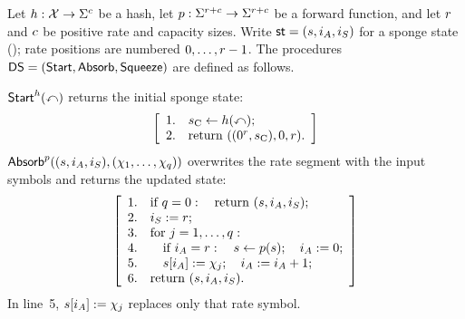 \begin{construction}
\label{constr:dsfs_duplex_sponge}
Let \(h:\mathcal X\to\Sigma^{c}\) be a hash, let \(p:\Sigma^{r+c}\to\Sigma^{r+c}\) be a forward function, and let \(r\) and \(c\) be positive rate and capacity sizes. Write \(\mathsf{st}=(s,i_A,i_S)\) for a sponge state (); rate positions are numbered \(0,\ldots,r-1\). The procedures \(\mathsf{DS}=(\mathsf{Start},\mathsf{Absorb},\mathsf{Squeeze})\) are defined as follows.

\emph{\(\mathsf{Start}^h(\mathbb{x})\)} returns the initial sponge state:
\begin{equation*}
\left[\begin{array}{rl}
  1.& s_{\mathrm C}\leftarrow h(\mathbb{x});\\
  2.& \text{return }((0^{r},s_{\mathrm C}),0,r).
\end{array}\right]
\end{equation*}
\emph{\(\mathsf{Absorb}^p((s,i_A,i_S),(\chi_1,\ldots,\chi_q))\)} overwrites the rate segment with the input symbols and returns the updated state:
\begin{equation*}
\left[\begin{array}{rl}
  1.& \text{if }q=0:\quad\text{return }(s,i_A,i_S);\\
  2.& i_S:=r;\\
  3.& \text{for }j=1,\ldots,q:\\
  4.& \quad\text{if }i_A=r:\quad s\leftarrow p(s);\quad i_A:=0;\\
  5.& \quad s[i_A]:=\chi_j;\quad i_A:=i_A+1;\\
  6.& \text{return }(s,i_A,i_S).
\end{array}\right]
\end{equation*}
\label{item:dsfs_sponge_write_rate}
In line~5, \(s[i_A]:=\chi_j\) replaces only that rate symbol.


\end{construction}

